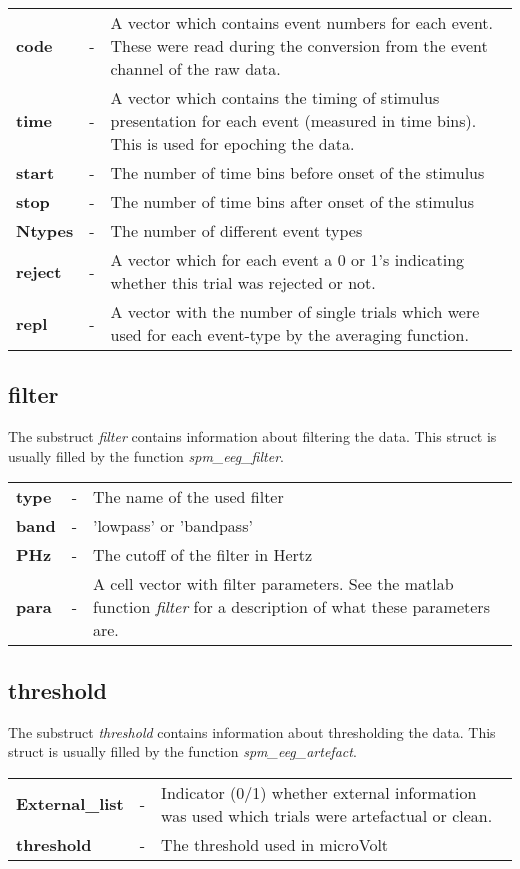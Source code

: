 \begin{tabular}{lcp{9cm}}
{\bf code} & - & A vector which contains event numbers for each event.
These were read during the conversion from the event channel of the
raw data.\\
{\bf time} & - & A vector which contains the timing of stimulus
presentation for each event (measured in time bins). This is used for
epoching the data.\\
{\bf start} & - & The number of time bins before onset of the
stimulus\\
{\bf stop} & - & The number of time bins after onset of the
stimulus\\
{\bf Ntypes} & - & The number of different event types\\
{\bf reject} & - & A vector which for each event a 0 or 1's indicating
whether this trial was rejected or not.\\
{\bf repl} & - & A vector with the number of single trials which were
used for each event-type by the averaging function.\\
\end{tabular}


\subsection{filter}
The substruct {\it filter} contains information about filtering the
data. This struct is usually filled by the function {\it
  spm\_eeg\_filter}.

\begin{tabular}{lcp{9cm}}
{\bf type} & - & The name of the used filter\\
{\bf band} & - & 'lowpass' or 'bandpass'\\
{\bf PHz} & - & The cutoff of the filter in Hertz\\
{\bf para} & - & A cell vector with filter parameters. See the matlab
function {\it filter} for a description of what these parameters are.
\end{tabular}

\subsection{threshold}
The substruct {\it threshold} contains information about thresholding
  the data. This struct is usually filled by the function {\it
  spm\_eeg\_artefact}.

\begin{tabular}{lcp{9cm}}
{\bf External\_list} & - & Indicator (0/1) whether external information
was used which trials were artefactual or clean.\\
{\bf threshold} & - & The threshold used in microVolt
\end{tabular}


